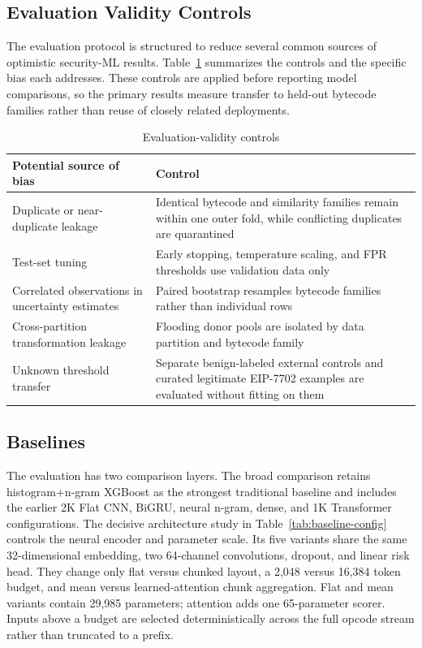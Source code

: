 \documentclass[conference]{IEEEtran}
\begin{document}
\subsection{Evaluation Validity Controls}

The evaluation protocol is structured to reduce several common sources of optimistic security-ML results. Table~\ref{tab:validity-controls} summarizes the controls and the specific bias each addresses. These controls are applied before reporting model comparisons, so the primary results measure transfer to held-out bytecode families rather than reuse of closely related deployments.

\begin{table}[t]
\centering
\caption{Evaluation-validity controls}
\label{tab:validity-controls}
\scriptsize
\begin{tabularx}{\columnwidth}{@{}X X@{}}
\toprule
Potential source of bias & Control \\
\midrule
Duplicate or near-duplicate leakage & Identical bytecode and similarity families remain within one outer fold, while conflicting duplicates are quarantined \\
Test-set tuning & Early stopping, temperature scaling, and FPR thresholds use validation data only \\
Correlated observations in uncertainty estimates & Paired bootstrap resamples bytecode families rather than individual rows \\
Cross-partition transformation leakage & Flooding donor pools are isolated by data partition and bytecode family \\
Unknown threshold transfer & Separate benign-labeled external controls and curated legitimate EIP-7702 examples are evaluated without fitting on them \\
\bottomrule
\end{tabularx}
\end{table}

\subsection{Baselines}

The evaluation has two comparison layers. The broad comparison retains histogram+n-gram XGBoost as the strongest traditional baseline and includes the earlier 2K Flat CNN, BiGRU, neural n-gram, dense, and 1K Transformer configurations. The decisive architecture study in Table~\ref{tab:baseline-config} controls the neural encoder and parameter scale. Its five variants share the same 32-dimensional embedding, two 64-channel convolutions, dropout, and linear risk head. They change only flat versus chunked layout, a 2,048 versus 16,384 token budget, and mean versus learned-attention chunk aggregation. Flat and mean variants contain 29,985 parameters; attention adds one 65-parameter scorer. Inputs above a budget are selected deterministically across the full opcode stream rather than truncated to a prefix.
\end{document}
